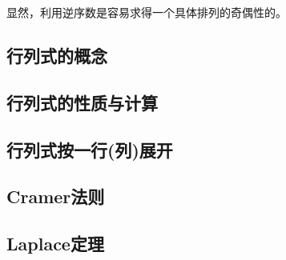 显然，利用逆序数是容易求得一个具体排列的奇偶性的。

\subsection{行列式的概念}
\label{sec:determinant-concept}

\subsection{行列式的性质与计算}
\label{sec:determinant-properties}

\subsection{行列式按一行(列)展开}
\label{sec:determinant-expand-by-row-or-column}

\subsection{Cramer法则}
\label{sec:cramer-rule}

\subsection{Laplace定理}
\label{sec:laplace-theorem}




